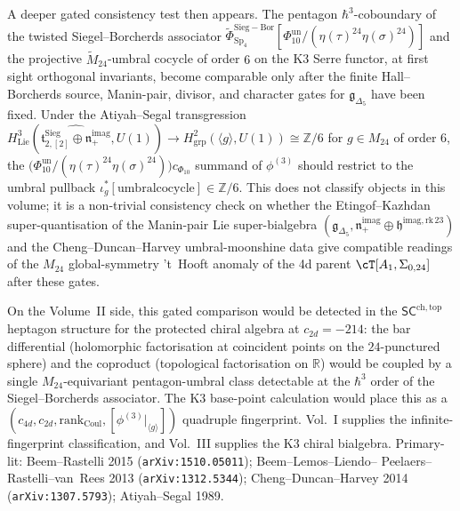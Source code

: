 A deeper gated consistency test then appears. The pentagon
$\hbar^3$-coboundary of the twisted Siegel--Borcherds associator
\(\widetilde\Phi^{\mathrm{Sieg-Bor}}_{\mathrm{Sp}_4}
[\Phi_{10}^{\mathrm{un}}/(\eta(\tau)^{24}\eta(\sigma)^{24})]\)
and the projective $\widetilde{M}_{24}$-umbral cocycle of order
$6$ on the K3 Serre functor, at first sight orthogonal invariants,
become comparable only after the finite Hall--Borcherds source,
Manin-pair, divisor, and character gates for $\mathfrak{g}_{\Delta_5}$
have been fixed. Under the Atiyah--Segal transgression
$H^3_{\mathrm{Lie}}(\widehat{\mathfrak{t}^{\mathrm{Sieg}}_{2,[2]}
\oplus\mathfrak{n}_+^{\mathrm{imag}}}, U(1))\to H^2_{\mathrm{grp}}(
\langle g\rangle, U(1))\cong\mathbb{Z}/6$ for $g\in M_{24}$ of
order $6$, the
\(\bigl(\Phi_{10}^{\mathrm{un}}/(\eta(\tau)^{24}\eta(\sigma)^{24})\bigr)c_{\Phi_{10}}\) summand
of $\phi^{(3)}$ should restrict to the umbral pullback
$\iota_g^*[\mathrm{umbral cocycle}]\in\mathbb{Z}/6$. This does not
classify objects in this volume; it is a non-trivial consistency check
on whether the Etingof--Kazhdan
super-quantisation of the Manin-pair Lie super-bialgebra
$(\mathfrak{g}_{\Delta_5}, \mathfrak{n}_+^{\mathrm{imag}}\oplus
\mathfrak{h}^{\mathrm{imag,rk\,23}})$ and the
Cheng--Duncan--Harvey umbral-moonshine data give compatible readings
of the $M_{24}$ global-symmetry 't~Hooft anomaly of the 4d parent
$\cT[A_1,\Sigma_{0,24}]$ after these gates.

On the Volume~II side, this gated comparison would be detected in the
$\mathsf{SC}^{\mathrm{ch,top}}$ heptagon structure for the
protected chiral algebra at $c_{2d} = -214$: the bar
differential (holomorphic factorisation at coincident points on
the $24$-punctured sphere) and the coproduct (topological
factorisation on $\mathbb R$) would be coupled by a single
$M_{24}$-equivariant pentagon-umbral class detectable at the
$\hbar^3$ order of the Siegel--Borcherds associator. The K3 base-point
calculation would place this as a $(c_{4d}, c_{2d},
\mathrm{rank}_{\mathrm{Coul}}, [\phi^{(3)}|_{\langle g\rangle}])$
quadruple fingerprint. Vol.~I supplies the infinite-fingerprint
classification, and Vol.~III supplies the K3 chiral bialgebra.
Primary-lit:
Beem--Rastelli 2015 (\texttt{arXiv:1510.05011}); Beem--Lemos--Liendo--
Peelaers--Rastelli--van~Rees 2013 (\texttt{arXiv:1312.5344});
Cheng--Duncan--Harvey 2014 (\texttt{arXiv:1307.5793});
Atiyah--Segal 1989.

\label{conj:chromatic}%
\label{def:rich-boundary}%
\label{eq:yangian-relation-modes}%
\label{sec:e1-holographic-bridge}%
\label{sec:e1-theorems}%
\label{sec:exact-boundary-linear}%
\label{sec:steinberg-from-bar}%
\label{sec:string-theoretic-blueprint}%
\label{setup:affine-pva-setup}%
\label{subsec:gravity-shadow-tower}%
\label{thm:agt-2d-bar-cobar}%
\label{thm:explicit-small-model}%
\label{def:geometric-steinberg}%
\label{prop:formal-legendre}%
\label{prop:steinberg-convolution}%
\label{sec:steinberg-motivation}%
\label{sec:ym-synthesis}%

